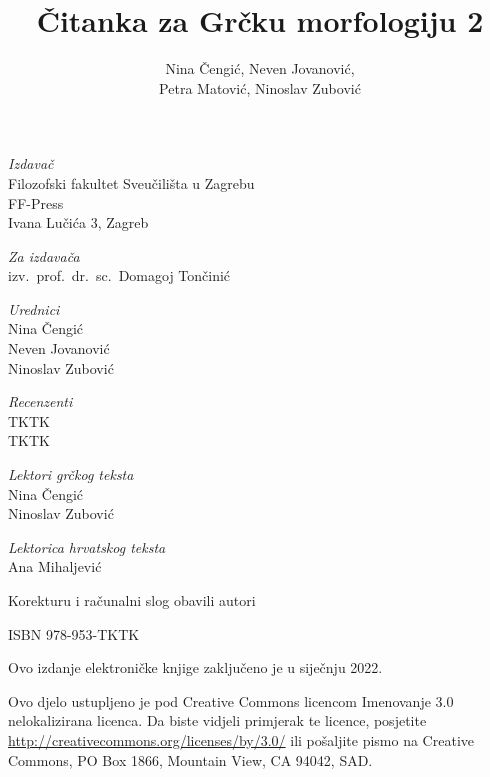 \documentclass[a4paper,12pt,twoside]{report}
\def\secondpage{\clearpage\null\vfill
\pagestyle{empty}
\begin{minipage}[b]{0.9\textwidth}
\begin{center}
\textit{Izdavač}\\
Filozofski fakultet Sveučilišta u Zagrebu\\
FF-Press\\
Ivana Lučića 3, Zagreb

\bigskip

\textit{Za izdavača}\\
izv.\ prof.\ dr.\ sc.\ Domagoj Tončinić

\bigskip

\textit{Urednici}\\
Nina Čengić\\
Neven Jovanović\\
Ninoslav Zubović

\bigskip

\textit{Recenzenti}\\
TKTK\\
TKTK

\bigskip

\textit{Lektori grčkog teksta}\\
Nina Čengić\\
Ninoslav Zubović

\textit{Lektorica hrvatskog teksta}\\
Ana Mihaljević

\bigskip

Korekturu i računalni slog obavili autori

\bigskip

ISBN 978-953-TKTK

\bigskip

Ovo izdanje elektroničke knjige zaključeno je u siječnju 2022.




\end{center}
\footnotesize\raggedright
\setlength{\parskip}{0.5\baselineskip}
\noindent Ovo djelo ustupljeno je pod Creative Commons licencom Imenovanje 3.0 nelokalizirana licenca. Da biste vidjeli primjerak te licence, posjetite \url{http://creativecommons.org/licenses/by/3.0/} ili pošaljite pismo na Creative Commons, PO Box 1866, Mountain View, CA 94042, SAD. 

\end{minipage}
\vspace*{3\baselineskip}
}
\begin{document}
\title{Čitanka za Grčku morfologiju 2}
\author{Nina Čengić, Neven Jovanović, \\Petra Matović, Ninoslav Zubović}
\date{}
\secondpage
\end{document}
